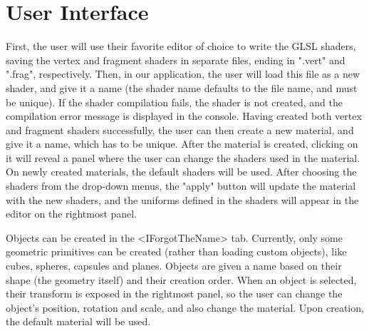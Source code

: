 \section{User Interface}
First, the user will use their favorite editor of choice to write the GLSL shaders, saving the vertex and fragment shaders in separate files, ending in ".vert" and ".frag", respectively. Then, in our application, the user will load this file as a new shader, and give it a name (the shader name defaults to the file name, and must be unique). If the shader compilation fails, the shader is not created, and the compilation error message is displayed in the console. Having created both vertex and fragment shaders successfully, the user can then create a new material, and give it a name, which has to be unique. After the material is created, clicking on it will reveal a panel where the user can change the shaders used in the material. On newly created materials, the default shaders will be used. After choosing the shaders from the drop-down menus, the "apply" button will update the material with the new shaders, and the uniforms defined in the shaders will appear in the editor on the rightmost panel.

Objects can be created in the <IForgotTheName> tab. Currently, only some geometric primitives can be created (rather than loading custom objects), like cubes, spheres, capsules and planes. Objects are given a name based on their shape (the geometry itself) and their creation order. When an object is selected, their transform is exposed in the rightmost panel, so the user can change the object's position, rotation and scale, and also change the material. Upon creation, the default material will be used.
